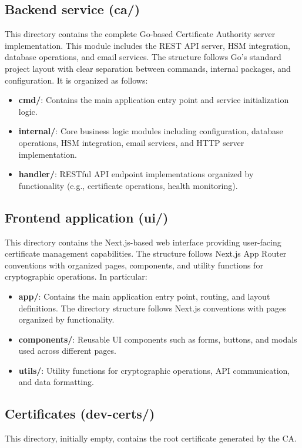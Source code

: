 \subsection{Backend service (ca/)}
This directory contains the complete Go-based Certificate Authority 
server implementation. This module includes the REST API server, HSM integration, 
database operations, and email services. The structure follows Go's standard 
project layout with clear separation between commands, internal packages, and 
configuration. It is organized as follows:
\begin{itemize}
    \item \textbf{cmd/}: Contains the main application entry point and service 
    initialization logic.
    \item \textbf{internal/}: Core business logic modules including configuration, 
    database operations, HSM integration, email services, and HTTP server implementation.
    \item \textbf{handler/}: RESTful API endpoint implementations organized by 
    functionality (e.g., certificate operations, health monitoring).
\end{itemize}

\subsection{Frontend application (ui/)}
This directory contains the Next.js-based web interface 
providing user-facing certificate management capabilities. The structure follows 
Next.js App Router conventions with organized pages, components, and utility 
functions for cryptographic operations.
In particular:
\begin{itemize}
    \item \textbf{app/}: Contains the main application entry point, routing, and 
    layout definitions. The directory structure follows Next.js conventions with 
    pages organized by functionality.
    \item \textbf{components/}: Reusable UI components such as forms, buttons, 
    and modals used across different pages.
    \item \textbf{utils/}: Utility functions for cryptographic operations, API 
    communication, and data formatting.
\end{itemize}

\subsection{Certificates (dev-certs/)}
This directory, initially empty, contains the root certificate generated by the CA.


